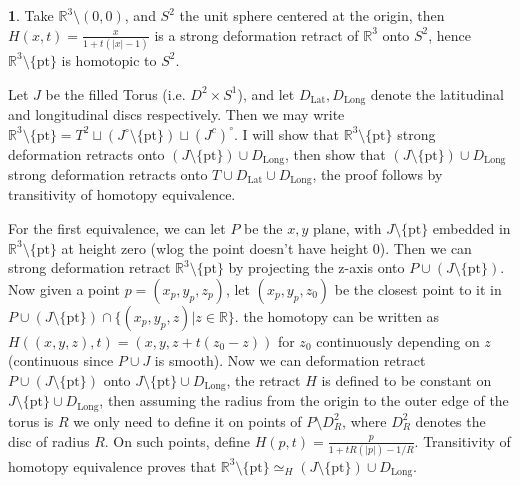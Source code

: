 \documentclass[10.5pt]{article}
\theoremstyle{definition}
\newtheorem{pb}{}
\newcommand{\set}[1]{\{#1\}}
\newcommand{\abs}[1]{\lvert#1\rvert}
\newcommand{\ism}{\simeq}
\begin{document}
    \begin{pb}
        Take \(\mathbb{R}^3 \setminus (0,0)\), and \(S^2\) the unit sphere centered at the origin, then \(H(x,t) = \frac{x}{1+t(\abs{x}-1)}\) is a strong deformation retract of
        \(\mathbb{R}^3\) onto \(S^2\), hence \(\mathbb{R}^3 \setminus \set{\text{pt}}\) is homotopic to \(S^2\).

        Let \(J \) be the filled Torus (i.e. \(D^2 \times S^1\)), and let \(D_\text{Lat}, D_\text{Long}\) denote the latitudinal and longitudinal discs respectively. 
        Then we may write \(\mathbb{R}^3 \setminus \set{\text{pt}} = T^2 \sqcup (J^\circ \setminus \set{\text{pt}}) \sqcup \left(J^c\right)^\circ\).
        I will show that \(\mathbb{R}^3 \setminus \set{\text{pt}}\) strong deformation retracts onto \((J \setminus \set{\text{pt}}) \cup D_\text{Long}\), then show that
        \((J \setminus \set{\text{pt}}) \cup D_\text{Long}\) strong deformation retracts onto \(T \cup D_\text{Lat} \cup D_\text{Long}\), the proof follows by transitivity of homotopy equivalence.

        For the first equivalence, we can let \(P\) be the \(x,y\) plane, with \(J \setminus \set{\text{pt}}\) embedded in \(\mathbb{R}^3 \setminus \set{\text{pt}}\) at height zero 
        (wlog the point doesn't have height 0). Then we can strong deformation retract \(\mathbb{R}^3 \setminus \set{\text{pt}}\) by projecting the z-axis onto \(P \cup (J \setminus \set{\text{pt}})\). 
        Now given a point \(p = (x_p,y_p,z_p)\), let \((x_p,y_p,z_0)\) be the closest point to it in \(P \cup (J \setminus \set{\text{pt}}) \cap \set{(x_p,y_p,z) \vert z \in \mathbb{R}}\).
        the homotopy can be written as \(H((x,y,z),t) = (x,y,z + t(z_0 - z))\) for \(z_0\) continuously depending on \(z\)(continuous since \(P \cup J\) is smooth). 
        Now we can deformation retract \(P \cup (J \setminus \set{\text{pt}})\) onto \(J \setminus \set{\text{pt}} \cup D_{\text{Long}}\),
        the retract \(H\) is defined to be constant on \(J \setminus \set{\text{pt}} \cup D_{\text{Long}}\), then assuming the radius from the origin to the outer edge of the torus is \(R\)
        we only need to define it on points of \(P \setminus D^2_R\), where \(D^2_R\) denotes the disc of radius \(R\). On such points, define \(H(p,t) = \frac{p}{1 + tR(\abs{p}) - 1/R}\).
        Transitivity of homotopy equivalence proves that \(\mathbb{R}^3 \setminus \set{\text{pt}} \ism_{H} (J \setminus \set{\text{pt}}) \cup D_\text{Long}\).
        

\end{pb}
\end{document}
